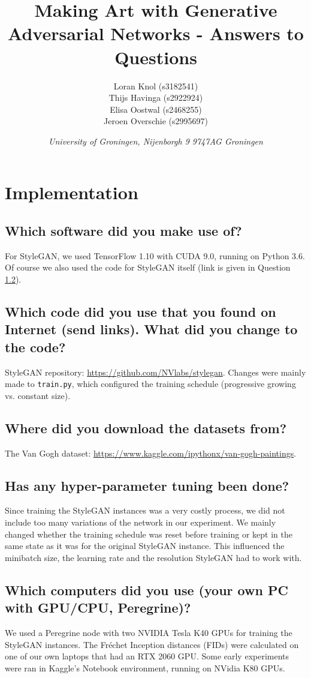 \documentclass{article}
\title{\textbf{\huge Making Art with Generative Adversarial Networks - Answers to Questions}}
\author{Loran Knol (s3182541)\\Thijs Havinga (s2922924)\\Elisa Oostwal (s2468255)\\Jeroen Overschie (s2995697)}
\date{\textit{University of Groningen, Nijenborgh 9 9747AG Groningen}}
\begin{document}
\ttl
\thispagestyle{empty}

\section{Implementation}

\subsection{Which software did you make use of?}
For StyleGAN, we used TensorFlow 1.10 with CUDA 9.0, running on Python 3.6. Of course we also used the code for StyleGAN itself (link is given in Question \ref{_sec:internet_code}).

\subsection{Which code did you use that you found on Internet (send links). What did you change to the code?}\label{_sec:internet_code}
StyleGAN repository: \url{https://github.com/NVlabs/stylegan}. Changes were mainly made to \verb|train.py|, which configured the training schedule (progressive growing vs. constant size).

\subsection{Where did you download the datasets from?}
The Van Gogh dataset: \url{https://www.kaggle.com/ipythonx/van-gogh-paintings}.

\subsection{Has any hyper-parameter tuning been done?}
Since training the StyleGAN instances was a very costly process, we did not include too many variations of the network in our experiment. We mainly changed whether the training schedule was reset before training or kept in the same state as it was for the original StyleGAN instance. This influenced the minibatch size, the learning rate and the resolution StyleGAN had to work with.

\subsection{Which computers did you use (your own PC with GPU/CPU, Peregrine)?}
We used a Peregrine node with two NVIDIA Tesla K40 GPUs for training the StyleGAN instances. The Fréchet Inception distances (FIDs) were calculated on one of our own laptops that had an RTX 2060 GPU. Some early experiments were ran in Kaggle's Notebook environment, running on NVidia K80 GPUs.
\end{document}
